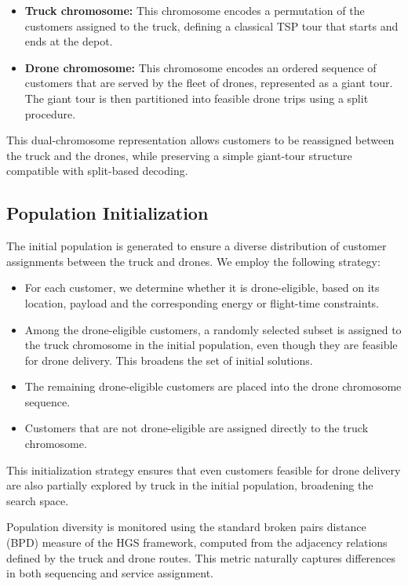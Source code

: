 \documentclass[3p, authoryear, 11pt]{elsarticle}
\begin{document}
\begin{itemize}
    \item \textbf{Truck chromosome:} This chromosome encodes a permutation of the customers assigned to the truck, defining a classical TSP tour that starts and ends at the depot.
    
    \item \textbf{Drone chromosome:} This chromosome encodes an ordered sequence of customers that are served by the fleet of drones, represented as a giant tour. The giant tour is then partitioned into feasible drone trips using a split procedure.     
\end{itemize}

This dual-chromosome representation allows customers to be reassigned between the truck and the drones, while preserving a simple giant-tour structure compatible with split-based decoding.

\subsection{Population Initialization}

The initial population is generated to ensure a diverse distribution of customer assignments between the truck and drones. We employ the following strategy:

\begin{itemize}
    \item For each customer, we determine whether it is drone-eligible, based on its location, payload and the corresponding energy or flight-time constraints.
    \item Among the drone-eligible customers, a randomly selected subset is assigned to the truck chromosome in the initial population, even though they are feasible for drone delivery. This broadens the set of initial solutions.
    \item The remaining drone-eligible customers are placed into the drone chromosome sequence.
    \item Customers that are not drone-eligible are assigned directly to the truck chromosome.
\end{itemize}

This initialization strategy ensures that even customers feasible for drone delivery are also partially explored by truck in the initial population, broadening the search space.

Population diversity is monitored using the standard broken pairs distance (BPD) measure of the HGS framework, computed from the adjacency relations defined by the truck and drone routes. This metric naturally captures differences in both sequencing and service assignment.
\end{document}
